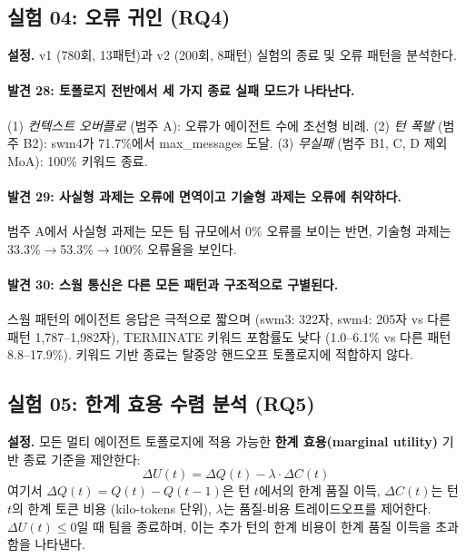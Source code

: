 \documentclass[a4paper,11pt]{article}
\begin{document}
\subsection{실험 04: 오류 귀인 (RQ4)}
\label{sec:exp04}

\textbf{설정.} v1 (780회, 13패턴)과 v2 (200회, 8패턴) 실험의 종료 및 오류 패턴을 분석한다.



\paragraph{발견 28: 토폴로지 전반에서 세 가지 종료 실패 모드가 나타난다.}
(1) \emph{컨텍스트 오버플로} (범주 A): 오류가 에이전트 수에 초선형 비례. (2) \emph{턴 폭발} (범주 B2): swm4가 71.7\%에서 max\_messages 도달. (3) \emph{무실패} (범주 B1, C, D 제외 MoA): 100\% 키워드 종료.

\paragraph{발견 29: 사실형 과제는 오류에 면역이고 기술형 과제는 오류에 취약하다.}
범주 A에서 사실형 과제는 모든 팀 규모에서 0\% 오류를 보이는 반면, 기술형 과제는 33.3\%$\to$53.3\%$\to$100\% 오류율을 보인다.

\paragraph{발견 30: 스웜 통신은 다른 모든 패턴과 구조적으로 구별된다.}
스웜 패턴의 에이전트 응답은 극적으로 짧으며 (swm3: 322자, swm4: 205자 vs 다른 패턴 1,787--1,982자), TERMINATE 키워드 포함률도 낮다 (1.0--6.1\% vs 다른 패턴 8.8--17.9\%). 키워드 기반 종료는 탈중앙 핸드오프 토폴로지에 적합하지 않다.

\subsection{실험 05: 한계 효용 수렴 분석 (RQ5)}
\label{sec:exp05}

\textbf{설정.} 모든 멀티 에이전트 토폴로지에 적용 가능한 \textbf{한계 효용(marginal utility)} 기반 종료 기준을 제안한다:
\begin{equation}
\Delta U(t) = \Delta Q(t) - \lambda \cdot \Delta C(t)
\end{equation}
여기서 $\Delta Q(t) = Q(t) - Q(t-1)$은 턴 $t$에서의 한계 품질 이득, $\Delta C(t)$는 턴 $t$의 한계 토큰 비용 (kilo-tokens 단위), $\lambda$는 품질-비용 트레이드오프를 제어한다. $\Delta U(t) \leq 0$일 때 팀을 종료하며, 이는 추가 턴의 한계 비용이 한계 품질 이득을 초과함을 나타낸다.
\end{document}
